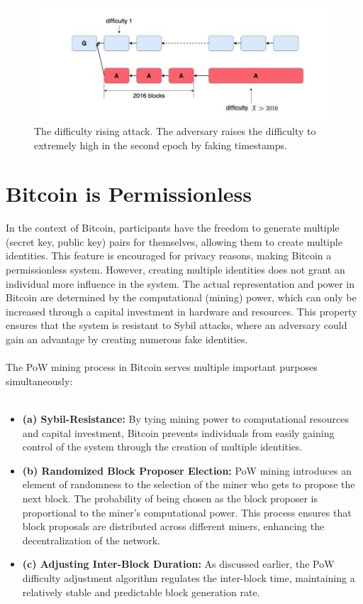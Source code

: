\documentclass{report}
\begin{document}
\begin{center}
	\begin{figure}[h!]
		\centering
		\includegraphics[width=0.6\linewidth]{Fig/F5}
		\caption{The difficulty rising attack. The adversary raises the difficulty to extremely high in the	second epoch by faking timestamps.}
		\label{fig:f5}
	\end{figure}
\end{center}
\section{Bitcoin is Permissionless}
In the context of Bitcoin, participants have the freedom to generate multiple (secret key, public key) pairs for themselves, allowing them to create multiple identities. This feature is encouraged for privacy reasons, making Bitcoin a permissionless system. However, creating multiple identities does not grant an individual more influence in the system. The actual representation and power in Bitcoin are determined by the computational (mining) power, which can only be increased through a capital investment in hardware and resources. This property ensures that the system is resistant to Sybil attacks, where an adversary could gain an advantage by creating numerous fake identities.\\\\
The PoW mining process in Bitcoin serves multiple important purposes simultaneously:\\\\
\begin{itemize}
	\item \textbf{(a) Sybil-Resistance: }By tying mining power to computational resources and capital investment, Bitcoin prevents individuals from easily gaining control of the system through the creation of multiple identities.
	\item \textbf{(b) Randomized Block Proposer Election: }PoW mining introduces an element of randomness to the selection of the miner who gets to propose the next block. The probability of being chosen as the block proposer is proportional to the miner's computational power. This process ensures that block proposals are distributed across different miners, enhancing the decentralization of the network.
	\item \textbf{(c) Adjusting Inter-Block Duration:} As discussed earlier, the PoW difficulty adjustment algorithm regulates the inter-block time, maintaining a relatively stable and predictable block generation rate.
\end{itemize}
\end{document}
